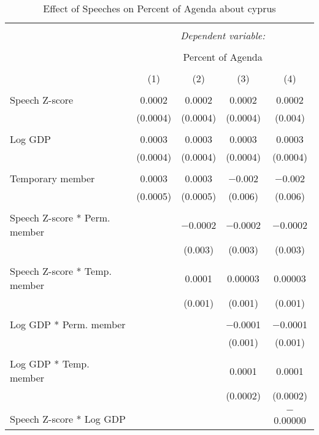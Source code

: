 
\begin{table}[!htbp] \centering 
  \caption{Effect of Speeches on Percent of Agenda about cyprus} 
  \label{} 
\begin{tabular}{@{\extracolsep{5pt}}lcccc} 
\\[-1.8ex]\hline 
\hline \\[-1.8ex] 
 & \multicolumn{4}{c}{\textit{Dependent variable:}} \\ 
\cline{2-5} 
\\[-1.8ex] & \multicolumn{4}{c}{Percent of Agenda} \\ 
\\[-1.8ex] & (1) & (2) & (3) & (4)\\ 
\hline \\[-1.8ex] 
 Speech Z-score & 0.0002 & 0.0002 & 0.0002 & 0.0002 \\ 
  & (0.0004) & (0.0004) & (0.0004) & (0.004) \\ 
  & & & & \\ 
 Log GDP & 0.0003 & 0.0003 & 0.0003 & 0.0003 \\ 
  & (0.0004) & (0.0004) & (0.0004) & (0.0004) \\ 
  & & & & \\ 
 Temporary member & 0.0003 & 0.0003 & $-$0.002 & $-$0.002 \\ 
  & (0.0005) & (0.0005) & (0.006) & (0.006) \\ 
  & & & & \\ 
 Speech Z-score * Perm. member &  & $-$0.0002 & $-$0.0002 & $-$0.0002 \\ 
  &  & (0.003) & (0.003) & (0.003) \\ 
  & & & & \\ 
 Speech Z-score * Temp. member &  & 0.0001 & 0.00003 & 0.00003 \\ 
  &  & (0.001) & (0.001) & (0.001) \\ 
  & & & & \\ 
 Log GDP * Perm. member &  &  & $-$0.0001 & $-$0.0001 \\ 
  &  &  & (0.001) & (0.001) \\ 
  & & & & \\ 
 Log GDP * Temp. member &  &  & 0.0001 & 0.0001 \\ 
  &  &  & (0.0002) & (0.0002) \\ 
  & & & & \\ 
 Speech Z-score * Log GDP &  &  &  & $-$0.00000 \\ 

\end{tabular}
\end{table}
